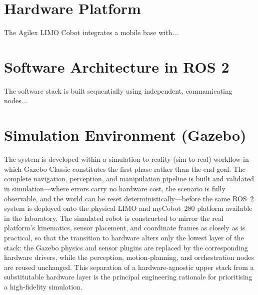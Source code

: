 \label{ch:implementation}

\section{Hardware Platform}
The Agilex LIMO Cobot integrates a mobile base with...

\section{Software Architecture in ROS 2}
The software stack is built sequentially using independent, communicating nodes...

\section{Simulation Environment (Gazebo)}
The system is developed within a simulation-to-reality (sim-to-real) workflow in which Gazebo
Classic constitutes the first phase rather than the end goal. The complete navigation,
perception, and manipulation pipeline is built and validated in simulation---where errors carry
no hardware cost, the scenario is fully observable, and the world can be reset
deterministically---before the same ROS~2 system is deployed onto the physical LIMO and
myCobot~280 platform available in the laboratory. The simulated robot is constructed to mirror
the real platform's kinematics, sensor placement, and coordinate frames as closely as is
practical, so that the transition to hardware alters only the lowest layer of the stack: the
Gazebo physics and sensor plugins are replaced by the corresponding hardware drivers, while the
perception, motion-planning, and orchestration nodes are reused unchanged. This separation of a
hardware-agnostic upper stack from a substitutable hardware layer is the principal engineering
rationale for prioritising a high-fidelity simulation.

